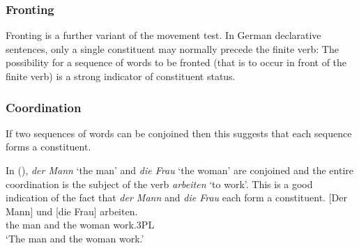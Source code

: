 \subsubsection{Fronting} 

Fronting is a further variant of the movement test. In German declarative sentences, only a single constituent may normally precede the finite verb:
\eal
\label{bsp-v2}
\zl 
The possibility for a sequence of words to be fronted (that is to occur in front of the finite verb) is a strong indicator of constituent status.

\subsubsection{Coordination}

If two sequences of words can be conjoined then this suggests that each sequence
forms a constituent.

In (), \emph{der Mann} `the man' and \emph{die Frau} `the woman' are conjoined and the entire coordination
is the subject of the verb \emph{arbeiten} `to work'. This is a good indication of the fact that \emph{der Mann} and
\emph{die Frau} each form a constituent.
\ea
\gll {}[Der        Mann] und [die          Frau] arbeiten.\\
     \spacebr{}the man   and \spacebr{}the woman work.3PL\\
\glt `The man and the woman work.'
\z


